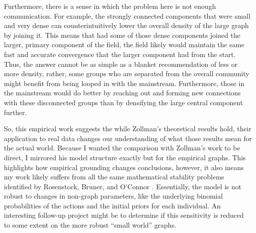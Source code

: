 Furthermore, there is a sense in which the problem here is not enough
communication. For example, the strongly connected components that were
small and very dense can counterintuitively lower the overall density of
the large graph by joining it. This means that had some of those dense
components joined the larger, primary component of the field, the field
likely would maintain the same fast and accurate convergence that the
larger component had from the start. Thus, the answer cannot be as
simple as a blanket recommendation of less or more density, rather, some
groups who are separated from the overall community might benefit from
being looped in with the mainstream. Furthermore, those in the
mainstream would do better by reaching out and forming new connections
with these disconnected groups than by densifying the large central
component further.

So, this empirical work suggests the while Zollman's theoretical results
hold, their application to real data changes our understanding of what
those results mean for the actual world. Because I wanted the comparison
with Zollman's work to be direct, I mirrored his model structure exactly
but for the empirical graphs. This highlights how empirical grounding
changes conclusions, however, it also means my work likely suffers from
all the same mathematical stability problems identified by Rosenstock,
Bruner, and O'Connor \autocite{rosenstockEpistemicNetworksLess2017a}.
Essentially, the model is not robust to changes in non-graph parameters,
like the underlying binomial probabilities of the actions and the
initial priors for each individual. An interesting follow-up project
might be to determine if this sensitivity is reduced to some extent on
the more robust ``small world'' graphs.
